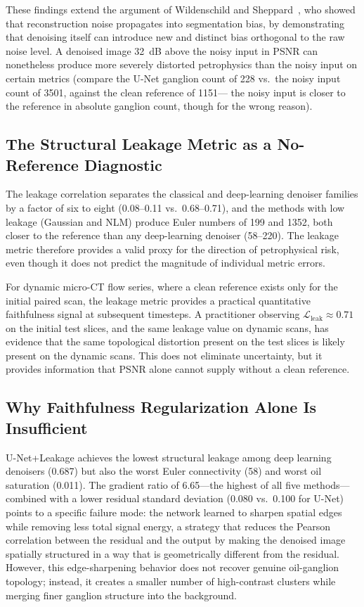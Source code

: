 \documentclass[review,12pt]{elsarticle}
\begin{document}
These findings extend the argument of Wildenschild and
Sheppard~\cite{Wildenschild2013}, who showed that reconstruction noise
propagates into segmentation bias, by demonstrating that denoising
itself can introduce new and distinct bias orthogonal to the raw noise
level.  A denoised image 32~dB above the noisy input in PSNR can
nonetheless produce more severely distorted petrophysics than the noisy
input on certain metrics (compare the U-Net ganglion count of 228 vs.\
the noisy input count of 3501, against the clean reference of 1151---
the noisy input is closer to the reference in absolute ganglion count,
though for the wrong reason).

\subsection{The Structural Leakage Metric as a No-Reference Diagnostic}
\label{sec:discussion:leakage_diagnostic}

The leakage correlation separates the classical and deep-learning
denoiser families by a factor of six to eight (0.08--0.11 vs.\
0.68--0.71), and the methods with low leakage (Gaussian and NLM) produce
Euler numbers of 199 and 1352, both closer to the reference than any
deep-learning denoiser (58--220).  The leakage metric therefore provides
a valid proxy for the direction of petrophysical risk, even though it
does not predict the magnitude of individual metric errors.

For dynamic micro-CT flow series, where a clean reference exists only
for the initial paired scan, the leakage metric provides a practical
quantitative faithfulness signal at subsequent timesteps.  A
practitioner observing $\mathcal{L}_{\mathrm{leak}} \approx 0.71$ on
the initial test slices, and the same leakage value on dynamic scans,
has evidence that the same topological distortion present on the test
slices is likely present on the dynamic scans.  This does not eliminate
uncertainty, but it provides information that PSNR alone cannot supply
without a clean reference.

\subsection{Why Faithfulness Regularization Alone Is Insufficient}
\label{sec:discussion:leakage_insufficient}

U-Net+Leakage achieves the lowest structural leakage among deep learning
denoisers (0.687) but also the worst Euler connectivity (58) and worst
oil saturation (0.011).  The gradient ratio of 6.65---the highest of
all five methods---combined with a lower residual standard deviation
(0.080 vs.\ 0.100 for U-Net) points to a specific failure mode: the
network learned to sharpen spatial edges while removing less total signal
energy, a strategy that reduces the Pearson correlation between the
residual and the output by making the denoised image spatially structured
in a way that is geometrically different from the residual.  However,
this edge-sharpening behavior does not recover genuine oil-ganglion
topology; instead, it creates a smaller number of high-contrast clusters
while merging finer ganglion structure into the background.
\end{document}
